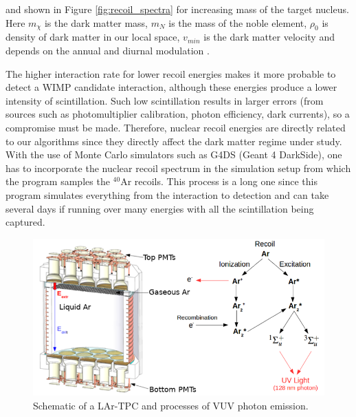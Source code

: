 \documentclass[11pt]{article} %
\begin{document}
and shown in Figure \ref{fig:recoil_spectra} for increasing mass of the target nucleus.
Here $m_{\chi}$ is the dark matter mass, $m_N$ is the mass of the noble element, $\rho_0$ is density of dark matter in our local space,
$v_{min}$ is the dark matter velocity and depends on the annual and diurnal modulation \cite{drukier1986detecting}.
\\
\par The higher interaction rate for lower recoil energies makes it more probable to detect a WIMP candidate interaction, although these energies produce a lower intensity of scintillation.
Such low scintillation results in larger errors
(from sources such as photomultiplier calibration, photon efficiency, dark currents), so a compromise must be made.
Therefore, nuclear recoil energies are directly related to our algorithms since they directly affect the dark matter regime under study.
With the use of Monte Carlo simulators such as G4DS (Geant 4 DarkSide), one has to incorporate the nuclear recoil spectrum in the simulation setup
from which the program samples the $^{40}\mathrm{\text{Ar}}$ recoils.
This process is a long one since this program simulates everything from the interaction to detection and
can take several days if running over many energies with all the scintillation being captured.
\\
\begin{figure}[H]
\centering
\includegraphics[scale=0.5]{images/detector.png}
\caption{\cite{edkins2017detailed} Schematic of a LAr-TPC and processes of VUV photon emission.}
\label{fig:detector}
\end{figure}
\end{document}
